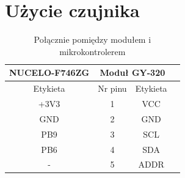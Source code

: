 \documentclass[11pt, a4paper]{article}
\begin{document}
\newpage






\newpage

\section{Użycie czujnika}



\vspace{0.5cm}
\begin{table}[h!]
    \centering
    \begin{tabular}{|c|c|c|c|} 
        \hline
        {NUCELO-F746ZG} & \multicolumn{2}{c|}{Moduł GY-320}  \\ 
        \hline
        Etykieta    &    Nr pinu &   Etykieta    \\ \hline
        +3V3    &        1   &   VCC \\  \hline
        GND     &      2   &   GND \\  \hline
        PB9     &      3   &   SCL \\  \hline
        PB6     &    4   &   SDA \\  \hline
        - & 5 & ADDR\\ \hline
    \end{tabular}
    \caption{Połącznie pomiędzy modułem i mikrokontrolerem}
    \label{tab:tab1}
\end{table}

\end{document}
